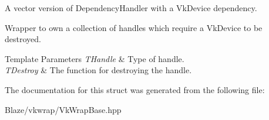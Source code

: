 A vector version of Dependency\+Handler with a Vk\+Device dependency. 

Wrapper to own a collection of handles which require a Vk\+Device to be destroyed.


\begin{DoxyTemplParams}{Template Parameters}
{\em T\+Handle} & Type of handle. \\
\hline
{\em T\+Destroy} & The function for destroying the handle. \\
\hline
\end{DoxyTemplParams}


The documentation for this struct was generated from the following file\+:\begin{DoxyCompactItemize}
\item 
Blaze/vkwrap/Vk\+Wrap\+Base.\+hpp\end{DoxyCompactItemize}
